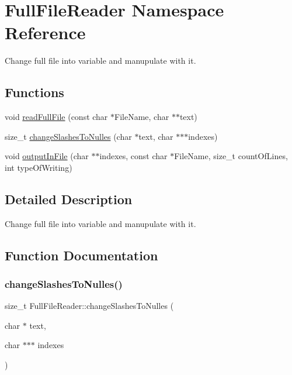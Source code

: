 \hypertarget{namespaceFullFileReader}{}\section{Full\+File\+Reader Namespace Reference}
\label{namespaceFullFileReader}


Change full file into variable and manupulate with it.  


\subsection*{Functions}
\begin{DoxyCompactItemize}
\item 
void \hyperlink{namespaceFullFileReader_a8a8460ef01d33cf06aa7418ff53d329c}{read\+Full\+File} (const char $\ast$File\+Name, char $\ast$$\ast$text)
\item 
size\+\_\+t \hyperlink{namespaceFullFileReader_a807082694773777924d2268aed960966}{change\+Slashes\+To\+Nulles} (char $\ast$text, char $\ast$$\ast$$\ast$indexes)
\item 
void \hyperlink{namespaceFullFileReader_a11be8a00a0b68356ad8b2e1ccb5ee8b5}{output\+In\+File} (char $\ast$$\ast$indexes, const char $\ast$File\+Name, size\+\_\+t count\+Of\+Lines, int type\+Of\+Writing)
\end{DoxyCompactItemize}


\subsection{Detailed Description}
Change full file into variable and manupulate with it. 

\subsection{Function Documentation}
\mbox{\label{namespaceFullFileReader_a807082694773777924d2268aed960966}} 
\subsubsection{\texorpdfstring{change\+Slashes\+To\+Nulles()}{changeSlashesToNulles()}}
{\footnotesize\ttfamily size\+\_\+t Full\+File\+Reader\+::change\+Slashes\+To\+Nulles (\begin{DoxyParamCaption}\item[{char $\ast$}]{text,  }\item[{char $\ast$$\ast$$\ast$}]{indexes }\end{DoxyParamCaption})}

